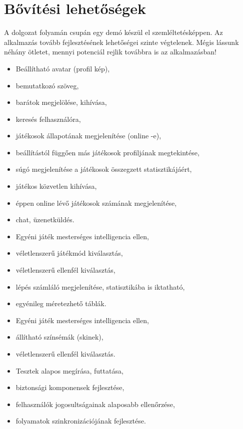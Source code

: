 \chapter{Bővítési lehetőségek}

A dolgozat folyamán csupán egy demó készül el szemléltetésképpen. Az alkalmazás tovább fejlesztésének lehetőségei szinte végtelenek. Mégis lássunk néhány ötletet, mennyi potenciál rejlik továbbra is az alkalmazásban!


\begin{itemize}
	\item Beállítható avatar (profil kép),
	\item bemutatkozó szöveg,
	\item barátok megjelölése, kihívása,
	\item keresés felhasználóra,
	\item játékosok állapotának megjelenítése (online -e),
	\item beállítástól függően más játékosok profiljának megtekintése,
	\item súgó megjelenítése a játékosok összegzett statisztikájáért,
	\item játékos közvetlen kihívása,
	\item éppen online lévő játékosok számának megjelenítése,
	\item chat, üzenetküldés.
\end{itemize}


\begin{itemize}
	\item Egyéni játék mesterséges intelligencia ellen,
	\item véletlenszerű játékmód kiválasztás,
	\item véletlenszerű ellenfél kiválasztás,
	\item lépés számláló megjelenítése, statisztikába is iktatható,
	\item egyénileg méretezhető táblák.
\end{itemize}


\begin{itemize}
	\item Egyéni játék mesterséges intelligencia ellen,
	\item állítható színsémák (skinek),
	\item véletlenszerű ellenfél kiválasztás.
\end{itemize}


\begin{itemize}
	\item Tesztek alapos megírása, futtatása,
	\item biztonsági komponensek fejlesztése,
	\item felhasználók jogosultságainak alaposabb ellenőrzése,
	\item folyamatok szinkronizációjának fejlesztése.
\end{itemize}
